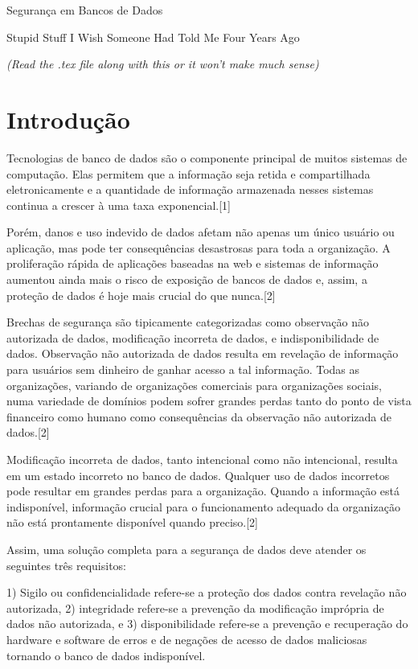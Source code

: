 \documentclass{article}
\begin{document}
\centerline{\sc \large Segurança em Bancos de Dados }
\vspace{.5pc}
\centerline{\sc Stupid Stuff I Wish Someone Had Told Me Four Years Ago}
\centerline{\it (Read the .tex file along with this or it won't 
            make much sense)}
\vspace{2pc}


\section{Introdução}

Tecnologias de banco de dados são o componente principal de muitos sistemas de computação. Elas permitem que a informação seja retida e compartilhada eletronicamente e a quantidade de informação armazenada nesses sistemas continua a crescer à uma taxa exponencial.[1]

Porém, danos e uso indevido de dados afetam não apenas um único usuário ou aplicação, mas pode ter consequências desastrosas para toda a organização. A proliferação rápida de aplicações baseadas na web e sistemas de informação aumentou ainda mais o risco de exposição de bancos de dados e, assim, a proteção de dados é hoje mais crucial do que nunca.[2]

Brechas de segurança são tipicamente categorizadas como observação não autorizada de dados, modificação incorreta de dados, e indisponibilidade de dados.  Observação não autorizada de dados resulta em revelação de informação para usuários sem dinheiro de ganhar acesso a tal informação. Todas as organizações, variando de organizações comerciais para organizações sociais, numa variedade de domínios podem sofrer grandes perdas tanto do ponto de vista financeiro como humano como consequências da observação não autorizada de dados.[2]

Modificação incorreta de dados, tanto intencional como não intencional, resulta em um estado incorreto no banco de dados. Qualquer uso de dados incorretos pode resultar em grandes perdas para a organização. Quando a informação está indisponível, informação crucial para o funcionamento adequado da organização não está prontamente disponível quando preciso.[2]

Assim, uma solução completa para a segurança de dados deve atender os seguintes três requisitos:

1)	Sigilo ou confidencialidade refere-se a proteção dos dados contra revelação não autorizada, 2) integridade refere-se a prevenção da modificação imprópria de dados não autorizada, e 3) disponibilidade refere-se a prevenção e recuperação do hardware e software de erros e de negações de acesso de dados maliciosas tornando o banco de dados indisponível.
\end{document}
